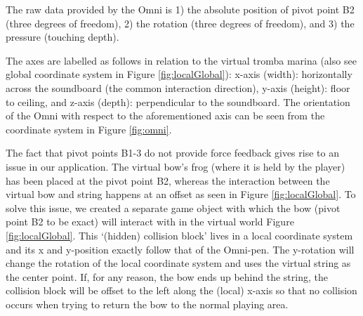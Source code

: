 \documentclass[dvipsnames, pdftex]{article}
\begin{document}
The raw data provided by the Omni is 1) the absolute position of pivot point B2 (three degrees of freedom), 2) the rotation (three degrees of freedom), and 3) the pressure (touching depth).

The axes are labelled as follows in relation to the virtual tromba marina (also see global coordinate system in Figure \ref{fig:localGlobal}): x-axis (width): horizontally across the soundboard (the common interaction direction), y-axis (height): floor to ceiling, and z-axis (depth): perpendicular to the soundboard. The orientation of the Omni with respect to the aforementioned axis can be seen from the coordinate system in Figure \ref{fig:omni}.

The fact that pivot points B1-3 do not provide force feedback gives rise to an issue in our application. The virtual bow's frog (where it is held by the player) has been placed at the pivot point B2, whereas the interaction between the virtual bow and string happens at an offset as seen in Figure \ref{fig:localGlobal}. To solve this issue, we created a separate game object with which the bow (pivot point B2 to be exact) will interact with in the virtual world Figure \ref{fig:localGlobal}. This `(hidden) collision block' lives in a local coordinate system and its x and y-position exactly follow that of the Omni-pen. The y-rotation will change the rotation of the local coordinate system and uses the virtual string as the center point. If, for any reason, the bow ends up behind the string, the collision block will be offset to the left along the (local) x-axis so that no collision occurs when trying to return the bow to the normal playing area. 
\end{document}
